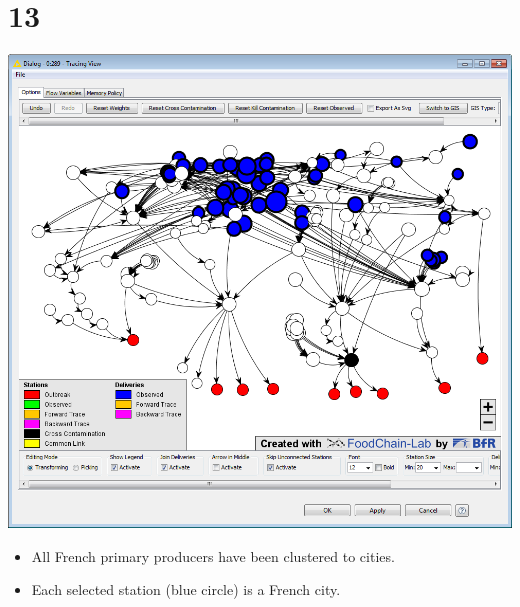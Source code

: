 \documentclass{beamer}
\begin{document}
\section{13}
\begin{frame}
	\begin{center}
  		\includegraphics[height=0.6\textheight]{13.png}
	\end{center}
	\begin{itemize}
		\item All French primary producers have been clustered to cities.
		\item Each selected station (blue circle) is a French city.
	\end{itemize}
\end{frame}
\end{document}
